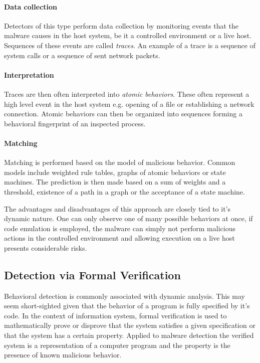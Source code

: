 \paragraph*{Data collection} Detectors of this type perform data collection by monitoring events that the malware causes in the host system, be it a controlled environment or a live host. Sequences of these events are called \emph{traces}. An example of a trace is a sequence of system calls or a sequence of sent network packets.

\paragraph*{Interpretation} Traces are then often interpreted into \emph{atomic behaviors}. These often represent a high level event in the host system e.g. opening of a file or establishing a network connection. Atomic behaviors can then be organized into sequences forming a behavioral fingerprint of an inspected process.

\paragraph*{Matching} Matching is performed based on the model of malicious behavior. Common models include weighted rule tables, graphs of atomic behaviors or state machines. The prediction is then made based on a sum of weights and a threshold, existence of a path in a graph or the acceptance of a state machine.

The advantages and disadvantages of this approach are closely tied to it's dynamic nature. One can only observe one of many possible behaviors at once, if code emulation is employed, the malware can simply not perform malicious actions in the controlled environment and allowing execution on a live host presents considerable risks.

\subsection{Detection via Formal Verification}
Behavioral detection is commonly associated with dynamic analysis. This may seem short-sighted given that the behavior of a program is fully specified by it's code. In the context of information system, formal verification is used to mathematically prove or disprove that the system satisfies a given specification or that the system has a certain property. Applied to malware detection the verified system is a representation of a computer program and the property is the presence of known malicious behavior.

